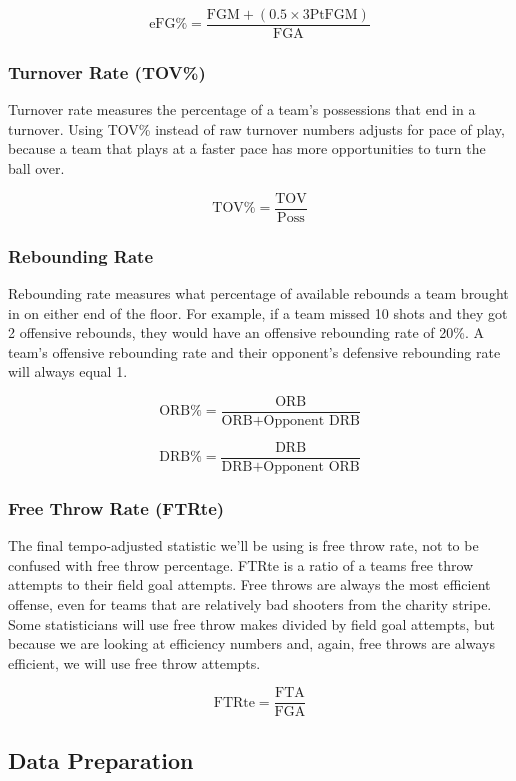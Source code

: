 \documentclass[
]{article}
\begin{document}
\[
\text{eFG%
\]

\subsubsection{Turnover Rate (TOV\%)}\label{turnover-rate-tov}

Turnover rate measures the percentage of a team's possessions that end
in a turnover. Using TOV\% instead of raw turnover numbers adjusts for
pace of play, because a team that plays at a faster pace has more
opportunities to turn the ball over.

\[
\text{TOV%
\]

\subsubsection{Rebounding Rate}\label{rebounding-rate}

Rebounding rate measures what percentage of available rebounds a team
brought in on either end of the floor. For example, if a team missed 10
shots and they got 2 offensive rebounds, they would have an offensive
rebounding rate of 20\%. A team's offensive rebounding rate and their
opponent's defensive rebounding rate will always equal 1.

\[
\text{ORB%
\]

\[
\text{DRB%
\]

\subsubsection{Free Throw Rate (FTRte)}\label{free-throw-rate-ftrte}

The final tempo-adjusted statistic we'll be using is free throw rate,
not to be confused with free throw percentage. FTRte is a ratio of a
teams free throw attempts to their field goal attempts. Free throws are
always the most efficient offense, even for teams that are relatively
bad shooters from the charity stripe. Some statisticians will use free
throw makes divided by field goal attempts, but because we are looking
at efficiency numbers and, again, free throws are always efficient, we
will use free throw attempts.

\[
\text{FTRte} = \frac{\text{FTA}}{\text{FGA}}
\]

\subsection{Data Preparation}\label{data-preparation}
\end{document}

